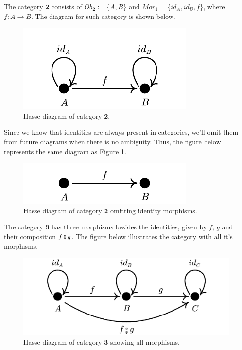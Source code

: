 \begin{example}
	The category $\bm 2$ consists of $Ob_{\bm 2} := \{A, B\}$ and $Mor_{\bm 1} = \{id_A, id_B, f\}$,
	where $f:A \to B$.
	The diagram for such category is shown below.
	\begin{figure}[H]
		\begin{center}
			\includegraphics{./notebooks/2Cat}
		\end{center}
		\caption{Hasse diagram of category $\bm 2$.}
		\label{fig:2Cat}
	\end{figure}

	Since we know that identities are always present in categories, we'll
	omit them from future diagrams when there is no ambiguity. Thus,
	the figure below represents the same diagram as Figure \ref{fig:2Cat}.
	\begin{figure}[H]
		\begin{center}
			\includegraphics{./notebooks/2Catsimple}
		\end{center}
		\caption{Hasse diagram of category $\bm 2$ omitting identity morphisms.}
		\label{fig:2Catsimple}
	\end{figure}

	The category $\bm 3$ has three morphisms besides the identities, given
	by $f$, $g$ and their composition $f \fatsemi g$. The figure below
	illustrates the category with all it's morphisms.

	\begin{figure}[H]
		\begin{center}
			\includegraphics{./notebooks/3CatComplete}
		\end{center}
		\caption{Hasse diagram of category $\bm 3$ showing all morphisms.}
		\label{fig:3Catcomplete}
	\end{figure}


\end{example}
